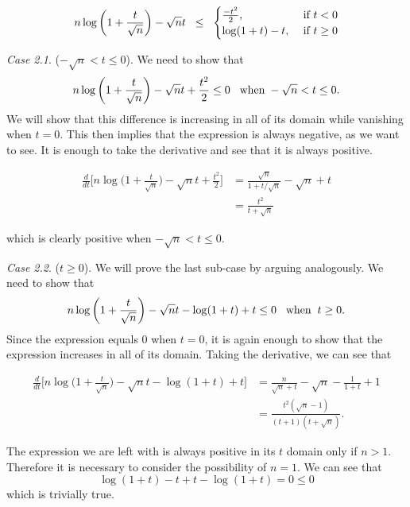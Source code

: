 \documentclass[12pt]{article}
\begin{document}
\[
   n\log\bigg(1+\frac{t}{\sqrt{ n}}\bigg)-\sqrt{n}t\hspace{2mm}\leq\hspace{2mm}\begin{cases}
  \frac{-t^2}{2}, & \mbox{ if $ t<0 $}\\
  \log(1+t)-t, & \mbox{ if $ t\geq 0 $}
  \end{cases} 
\]

\vspace{2mm}

\noindent\textit{Case 2.1}. ($-\sqrt{n}<t\leq0$). We need to show that $$n\log\bigg(1+\frac{t}{\sqrt{ n}}\bigg)-\sqrt{n}t+\frac{t^2}{2}\leq 0\hspace{3mm}\text{when}\hspace{1mm}-\sqrt{n}<t\leq0.$$ We will show that this difference is increasing in all of its domain while vanishing when $t=0$. This then implies that the expression is always negative, as we want to see. It is enough to take the derivative and see that it is always positive.

\begin{align*}
\frac{d}{dt}\bigg[n\log\bigg(1+\frac{t}{\sqrt{ n}}\bigg)-\sqrt{n}t+\frac{t^2}{2}\bigg]&=\frac{\sqrt{n}}{1+t/\sqrt{n}}-\sqrt{n}+t\\
&=\frac{t^2}{t+\sqrt{n}}
\end{align*}

\noindent which is clearly positive when $-\sqrt{n}<t\leq0$.

\vspace{4mm}

\noindent\textit{Case 2.2}. ($t\geq0$). We will prove the last sub-case by arguing analogously. We need to show that $$n\log\bigg(1+\frac{t}{\sqrt{ n}}\bigg)-\sqrt{n}t-\log(1+t)+t\leq 0\hspace{3mm}\text{when}\hspace{2mm}t\geq0.$$ Since the expression equals $0$ when $t=0$, it is again enough to show that the expression increases in all of its domain. Taking the derivative, we can see that 

\begin{align*}
\frac{d}{dt}\bigg[n\log\bigg(1+\frac{t}{\sqrt{ n}}\bigg)-\sqrt{n}t-\log(1+t)+t\bigg]&=\frac{n}{\sqrt{n}+t}-\sqrt{n}-\frac{1}{1+t}+1\\
&=\frac{t^2(\sqrt{n}-1)}{(t+1)(t+\sqrt{n})}.
\end{align*}

\noindent The expression we are left with is always positive in its $t$ domain only if $n>1$. Therefore it is necessary to consider the possibility of $n=1$. We can see that $$\log(1+t)-t+t-\log(1+t)=0\leq0$$ which is trivially true.
\end{document}
